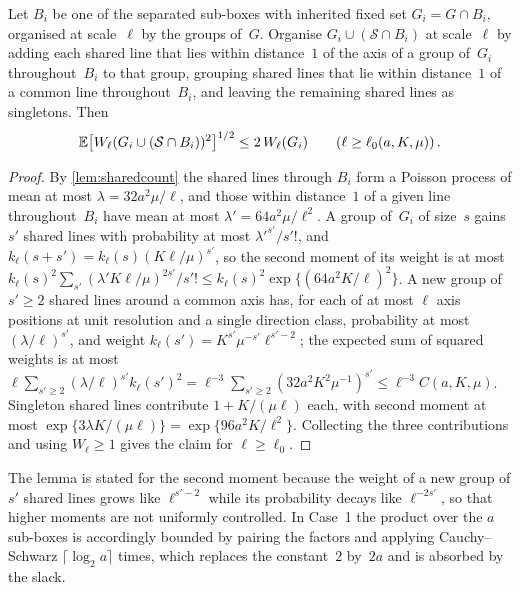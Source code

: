 \documentclass[11pt,letterpaper]{article}
\begin{document}
\begin{lemma}
\label{lem:sharedmoments}
Let $B_i$ be one of the separated sub-boxes with inherited fixed set $G_i=G\cap B_i$, organised at scale~$\ell$ by the groups of~$G$. Organise $G_i\cup(\mathcal S\cap B_i)$ at scale~$\ell$ by adding each shared line that lies within distance~$1$ of the axis of a group of~$G_i$ throughout~$B_i$ to that group, grouping shared lines that lie within distance~$1$ of a common line throughout~$B_i$, and leaving the remaining shared lines as singletons. Then
\begin{equation*}
  \mathbb E\bigl[W_\ell(G_i\cup(\mathcal S\cap B_i))^2\bigr]^{1/2}\le2\,W_\ell(G_i)\qquad(\ell\ge\ell_0(a,K,\mu))\,.
\end{equation*}
\end{lemma}

\begin{proof}
By \cref{lem:sharedcount} the shared lines through $B_i$ form a Poisson process of mean at most $\lambda=32a^2\mu/\ell$, and those within distance~$1$ of a given line throughout~$B_i$ have mean at most $\lambda'=64a^2\mu/\ell^2$. A group of~$G_i$ of size~$s$ gains $s'$ shared lines with probability at most $\lambda'^{s'}/s'!$, and $k_\ell(s+s')=k_\ell(s)(K\ell/\mu)^{s'}$, so the second moment of its weight is at most $k_\ell(s)^2\sum_{s'}(\lambda'K\ell/\mu)^{2s'}/s'!\le k_\ell(s)^2\exp\{(64a^2K/\ell)^2\}$. A new group of $s'\ge2$ shared lines around a common axis has, for each of at most $\ell$ axis positions at unit resolution and a single direction class, probability at most $(\lambda/\ell)^{s'}$, and weight $k_\ell(s')=K^{s'}\mu^{-s'}\ell^{s'-2}$; the expected sum of squared weights is at most $\ell\sum_{s'\ge2}(\lambda/\ell)^{s'}k_\ell(s')^2=\ell^{-3}\sum_{s'\ge2}(32a^2K^2\mu^{-1})^{s'}\le\ell^{-3}C(a,K,\mu)$. Singleton shared lines contribute $1+K/(\mu\ell)$ each, with second moment at most $\exp\{3\lambda K/(\mu\ell)\}=\exp\{96a^2K/\ell^2\}$. Collecting the three contributions and using $W_\ell\ge1$ gives the claim for $\ell\ge\ell_0$.
\end{proof}

The lemma is stated for the second moment because the weight of a new group of $s'$ shared lines grows like $\ell^{s'-2}$ while its probability decays like $\ell^{-2s'}$, so that higher moments are not uniformly controlled. In Case~1 the product over the $a$ sub-boxes is accordingly bounded by pairing the factors and applying Cauchy--Schwarz $\lceil\log_2a\rceil$ times, which replaces the constant~$2$ by~$2a$ and is absorbed by the slack.
\end{document}
